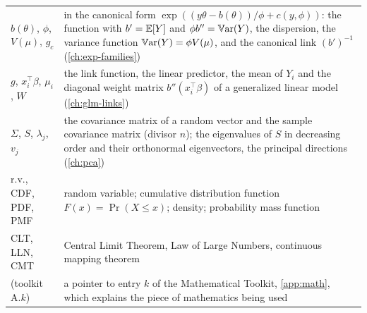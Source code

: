 \begin{small}
\begin{longtable}{@{}>{\raggedright\arraybackslash}p{1.55in}>{\raggedright\arraybackslash}p{4.35in}@{}}
$b(\theta)$, $\phi$, $V(\mu)$, $g_c$ & in the canonical form $\exp((y\theta - b(\theta))/\phi + c(y, \phi))$: the function with $b' = \operatorname*{\mathbb{E}}[Y]$ and $\phi b'' = \operatorname*{\mathbb{V}\text{ar}}(Y)$, the dispersion, the variance function $\operatorname*{\mathbb{V}\text{ar}}(Y) = \phi V(\mu)$, and the canonical link $(b')^{-1}$ (\cref{ch:exp-families}) \\[2pt]
$g$, $x_i^\top\beta$, $\mu_i$, $W$ & the link function, the linear predictor, the mean of $Y_i$ and the diagonal weight matrix $b''(x_i^\top\beta)$ of a generalized linear model (\cref{ch:glm-links}) \\[2pt]
$\Sigma$, $S$, $\lambda_j$, $v_j$ & the covariance matrix of a random vector and the sample covariance matrix (divisor $n$); the eigenvalues of $S$ in decreasing order and their orthonormal eigenvectors, the principal directions (\cref{ch:pca}) \\[2pt]
r.v., CDF, PDF, PMF & random variable; cumulative distribution function $F(x) = \Pr(X \leq x)$; density; probability mass function \\[2pt]
CLT, LLN, CMT & Central Limit Theorem, Law of Large Numbers, continuous mapping theorem \\[2pt]
(toolkit A.$k$) & a pointer to entry $k$ of the Mathematical Toolkit, \cref{app:math}, which explains the piece of mathematics being used \\
\end{longtable}
\end{small}
